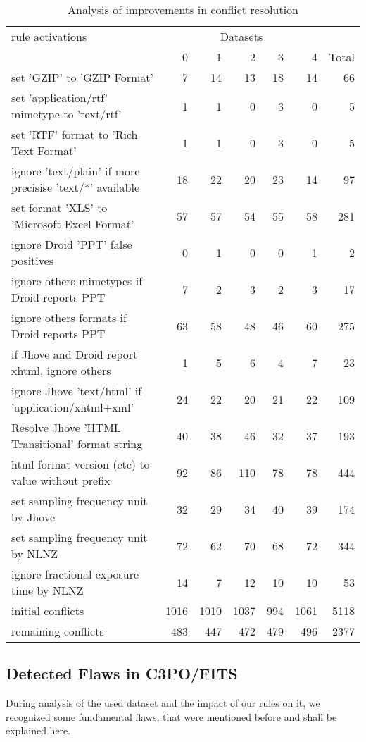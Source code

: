 \documentclass[a4paper,12pt]{article}
\begin{document}
\begin{table}[H]
\begin{center}
\begin{tabular}[h]{l||r|r|r|r|r||r}
rule activations &  \multicolumn{5}{c}{Datasets} \\
        & 0 & 1 & 2 & 3 & 4 & Total \\
\hline
set 'GZIP' to 'GZIP Format' & 7 & 14 & 13 & 18 & 14 & 66\\
set 'application/rtf' mimetype to 'text/rtf' & 1 & 1 & 0 & 3 & 0 & 5\\
set 'RTF' format to 'Rich Text Format' & 1 & 1 & 0 & 3 & 0 & 5\\
ignore 'text/plain' if more precisise 'text/*' available & 18 & 22 & 20 & 23 & 14 & 97\\
set format 'XLS' to 'Microsoft Excel Format' & 57 & 57 & 54 & 55 & 58 & 281\\
ignore Droid 'PPT' false positives & 0 & 1 & 0 & 0 & 1 & 2\\
ignore others mimetypes if Droid reports PPT & 7 & 2 & 3 & 2 & 3 & 17\\
ignore others formats if Droid reports PPT & 63 & 58 & 48 & 46 & 60 & 275\\
if Jhove and Droid report xhtml, ignore others & 1 & 5 & 6 & 4 & 7 & 23\\
ignore Jhove 'text/html' if 'application/xhtml+xml' & 24 & 22 & 20 & 21 & 22 & 109\\
Resolve Jhove 'HTML Transitional' format string & 40 & 38 & 46 & 32 & 37 & 193\\
html format version (etc) to value without prefix & 92 & 86 & 110 & 78 & 78 & 444\\
set sampling frequency unit by Jhove & 32 & 29 & 34 & 40 & 39 & 174\\
set sampling frequency unit by NLNZ & 72 & 62 & 70 & 68 & 72 & 344\\
ignore fractional exposure time by NLNZ & 14 & 7 & 12 & 10 & 10 & 53\\
\hline
initial conflicts & 1016 & 1010	& 1037 & 994 &1061 & 5118 \\
\hline
remaining conflicts & 483 &	447	& 472 &	479	& 496 &	2377

\end{tabular}
\end{center}
\caption{Analysis of improvements in conflict resolution}
\label{tab:conflicts}
\end{table}

\subsection{Detected Flaws in C3PO/FITS}
During analysis of the used dataset and the impact of our rules on it, we recognized some fundamental flaws, that were mentioned before and shall be explained here.
\end{document}
